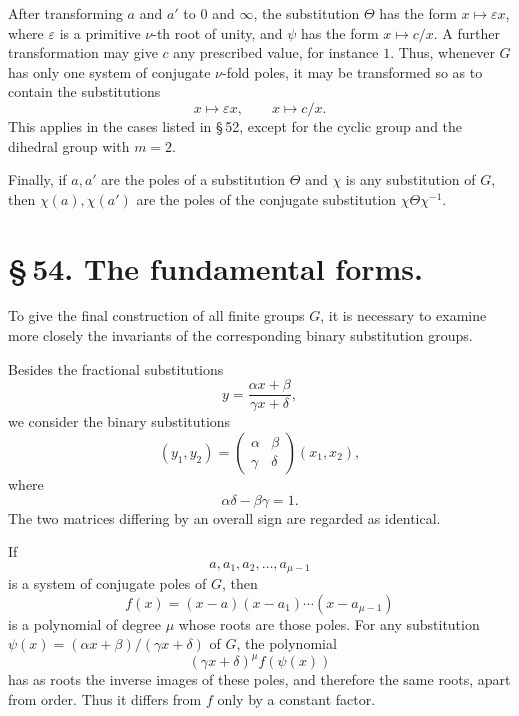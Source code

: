 \documentclass[11pt]{article}
\providecommand{\eps}{\varepsilon}
\providecommand{\eps}{\varepsilon}
\begin{document}
After transforming $a$ and $a'$ to $0$ and $\infty$, the substitution $\Theta$ has the form $x\mapsto\eps x$, where $\eps$ is a primitive $\nu$-th root of unity, and $\psi$ has the form $x\mapsto c/x$. A further transformation may give $c$ any prescribed value, for instance $1$. Thus, whenever $G$ has only one system of conjugate $\nu$-fold poles, it may be transformed so as to contain the substitutions
\[
x\mapsto\eps x,
\qquad x\mapsto c/x.
\]
This applies in the cases listed in \S\,52, except for the cyclic group and the dihedral group with $m=2$.

Finally, if $a,a'$ are the poles of a substitution $\Theta$ and $\chi$ is any substitution of $G$, then $\chi(a),\chi(a')$ are the poles of the conjugate substitution $\chi\Theta\chi^{-1}$.

\section*{\S\,54. The fundamental forms.}

To give the final construction of all finite groups $G$, it is necessary to examine more closely the invariants of the corresponding binary substitution groups.

Besides the fractional substitutions
\begin{equation}
y=\frac{\alpha x+\beta}{\gamma x+\delta},
\tag{1}
\end{equation}
we consider the binary substitutions
\begin{equation}
(y_1,y_2)=\begin{pmatrix}\alpha&\beta\\\gamma&\delta\end{pmatrix}(x_1,x_2),
\tag{2}
\end{equation}
where
\begin{equation}
\alpha\delta-\beta\gamma=1.
\tag{3}
\end{equation}
The two matrices differing by an overall sign are regarded as identical.

If
\begin{equation}
a,a_1,a_2,\ldots,a_{\mu-1}
\tag{4}
\end{equation}
is a system of conjugate poles of $G$, then
\begin{equation}
f(x)=(x-a)(x-a_1)\cdots(x-a_{\mu-1})
\tag{5}
\end{equation}
is a polynomial of degree $\mu$ whose roots are those poles. For any substitution $\psi(x)=(\alpha x+\beta)/(\gamma x+\delta)$ of $G$, the polynomial
\begin{equation}
(\gamma x+\delta)^\mu f(\psi(x))
\tag{6}
\end{equation}
has as roots the inverse images of these poles, and therefore the same roots, apart from order. Thus it differs from $f$ only by a constant factor.
\end{document}
